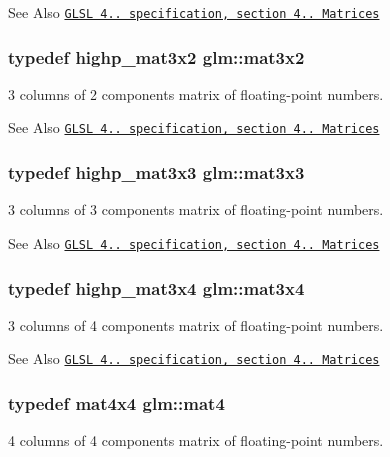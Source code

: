 \begin{DoxySeeAlso}{See Also}
\href{http://www.opengl.org/registry/doc/GLSLangSpec.4.20.8.pdf}{\tt G\-L\-S\-L 4.. specification, section 4.. Matrices} 
\end{DoxySeeAlso}
\hypertarget{group__core__types_gad7476e0e866186f12ee87975c6b01552}{
\subsubsection[{mat3x2}]{\setlength{\rightskip}{0pt plus 5cm}typedef highp\-\_\-mat3x2 {\bf glm\-::mat3x2}}}\label{group__core__types_gad7476e0e866186f12ee87975c6b01552}
3 columns of 2 components matrix of floating-\/point numbers.

\begin{DoxySeeAlso}{See Also}
\href{http://www.opengl.org/registry/doc/GLSLangSpec.4.20.8.pdf}{\tt G\-L\-S\-L 4.. specification, section 4.. Matrices} 
\end{DoxySeeAlso}
\hypertarget{group__core__types_ga6fecca6a869070b6bf8acb44ce1c2af3}{
\subsubsection[{mat3x3}]{\setlength{\rightskip}{0pt plus 5cm}typedef highp\-\_\-mat3x3 {\bf glm\-::mat3x3}}}\label{group__core__types_ga6fecca6a869070b6bf8acb44ce1c2af3}
3 columns of 3 components matrix of floating-\/point numbers.

\begin{DoxySeeAlso}{See Also}
\href{http://www.opengl.org/registry/doc/GLSLangSpec.4.20.8.pdf}{\tt G\-L\-S\-L 4.. specification, section 4.. Matrices} 
\end{DoxySeeAlso}
\hypertarget{group__core__types_ga5524ae15d7fc00a68b8e0e3a0733cc2a}{
\subsubsection[{mat3x4}]{\setlength{\rightskip}{0pt plus 5cm}typedef highp\-\_\-mat3x4 {\bf glm\-::mat3x4}}}\label{group__core__types_ga5524ae15d7fc00a68b8e0e3a0733cc2a}
3 columns of 4 components matrix of floating-\/point numbers.

\begin{DoxySeeAlso}{See Also}
\href{http://www.opengl.org/registry/doc/GLSLangSpec.4.20.8.pdf}{\tt G\-L\-S\-L 4.. specification, section 4.. Matrices} 
\end{DoxySeeAlso}
\hypertarget{group__core__types_ga7dcd2365c2e368e6af5b7adeb6a9c8df}{
\subsubsection[{mat4}]{\setlength{\rightskip}{0pt plus 5cm}typedef mat4x4 {\bf glm\-::mat4}}}\label{group__core__types_ga7dcd2365c2e368e6af5b7adeb6a9c8df}
4 columns of 4 components matrix of floating-\/point numbers.

